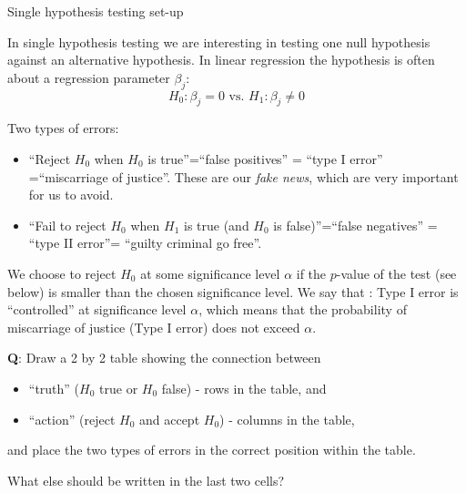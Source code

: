 \documentclass[10pt,ignorenonframetext,]{beamer}
\providecommand{\tightlist}{%
  \setlength{\itemsep}{0pt}\setlength{\parskip}{0pt}}
\begin{document}
\begin{frame}

\begin{block}{Single hypothesis testing set-up}

In single hypothesis testing we are interesting in testing one null
hypothesis against an alternative hypothesis. In linear regression the
hypothesis is often about a regression parameter \(\beta_j\):
\[H_0: \beta_j=0 \text{ vs. } H_1: \beta_j\neq 0\]

\begin{block}{Two types of errors:}

\begin{itemize}
\item
  ``Reject \(H_0\) when \(H_0\) is true''=``false positives'' = ``type I
  error'' =``miscarriage of justice''. These are our \emph{fake news},
  which are very important for us to avoid.
\item
  ``Fail to reject \(H_0\) when \(H_1\) is true (and \(H_0\) is
  false)''=``false negatives'' = ``type II error''= ``guilty criminal go
  free''.
\end{itemize}

\end{block}

\end{block}

\end{frame}

\begin{frame}

We choose to reject \(H_0\) at some significance level \(\alpha\) if the
\(p\)-value of the test (see below) is smaller than the chosen
significance level. We say that : Type I error is ``controlled'' at
significance level \(\alpha\), which means that the probability of
miscarriage of justice (Type I error) does not exceed \(\alpha\).

\textbf{Q}: Draw a 2 by 2 table showing the connection between

\begin{itemize}
\tightlist
\item
  ``truth'' (\(H_0\) true or \(H_0\) false) - rows in the table, and
\item
  ``action'' (reject \(H_0\) and accept \(H_0\)) - columns in the table,
\end{itemize}

and place the two types of errors in the correct position within the
table.

What else should be written in the last two cells?

\end{frame}
\end{document}
